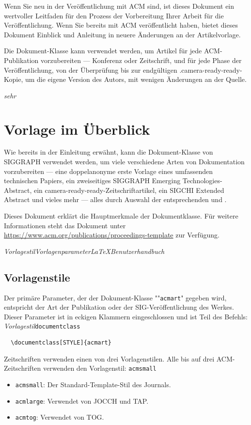 \documentclass[manuscript,screen,review]{acmart}
\begin{document}
Wenn Sie neu in der Veröffentlichung mit ACM sind, ist dieses Dokument ein wertvoller Leitfaden für den Prozess der Vorbereitung Ihrer Arbeit für die Veröffentlichung. Wenn Sie bereits mit ACM veröffentlicht haben, bietet dieses Dokument Einblick und Anleitung in neuere Änderungen an der Artikelvorlage.

Die Dokument-Klasse kann verwendet werden, um Artikel für jede ACM-Publikation vorzubereiten — Konferenz oder Zeitschrift, und für jede Phase der Veröffentlichung, von der Überprüfung bis zur endgültigen   .camera-ready-ready-Kopie, um die eigene Version des Autors, mit wenigen Änderungen an der Quelle.

{\itshape sehr}\section{Vorlage im Überblick}
Wie bereits in der Einleitung erwähnt, kann die Dokument-Klasse von SIGGRAPH verwendet werden, um viele verschiedene Arten von Dokumentation vorzubereiten — eine doppelanonyme erste Vorlage eines umfassenden technischen Papiers, ein zweiseitiges SIGGRAPH Emerging Technologies-Abstract, ein camera-ready-ready-Zeitschriftartikel, ein SIGCHI Extended Abstract und vieles mehr — alles durch Auswahl der entsprechenden und .

Dieses Dokument erklärt die Hauptmerkmale der Dokumentklasse. Für weitere Informationen steht das Dokument unter \url{https://www.acm.org/publications/proceedings-template} zur Verfügung.

{\itshape Vorlagestil}{\itshape Vorlagenparameter}{\itshape \LaTeX Benutzerhandbuch}\subsection{Vorlagenstile}

Der primäre Parameter, der der Dokument-Klasse ""\verb|acmart|" gegeben wird, entspricht der Art der Publikation oder der SIG-Veröffentlichung des Werkes. Dieser Parameter ist in eckigen Klammern eingeschlossen und ist Teil des Befehls:
{\itshape Vorlagestil}{\verb|documentclass|}\begin{verbatim}
  \documentclass[STYLE]{acmart}
\end{verbatim}

Zeitschriften verwenden einen von drei Vorlagenstilen. Alle bis auf drei ACM-Zeitschriften verwenden den Vorlagenstil:
{\verb|acmsmall|}\begin{itemize}
\item {\texttt{acmsmall}}: Der Standard-Template-Stil des Journals.
\item {\texttt{acmlarge}}: Verwendet von JOCCH und TAP.
\item {\texttt{acmtog}}: Verwendet von TOG.
\end{itemize}
\end{document}
